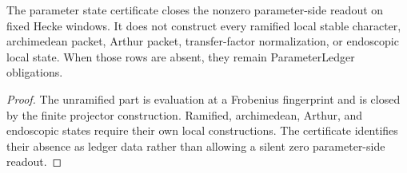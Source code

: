 \begin{theorem}
\label{thm:unified-reality-parameter-state-boundary}
The parameter state certificate closes the nonzero parameter-side
readout on fixed Hecke windows. It does not construct every ramified
local stable character, archimedean packet, Arthur packet,
transfer-factor normalization, or endoscopic local state. When those
rows are absent, they remain ParameterLedger obligations.
\end{theorem}
\begin{proof}
The unramified part is evaluation at a Frobenius fingerprint and is
closed by the finite projector construction. Ramified, archimedean,
Arthur, and endoscopic states require their own local constructions.
The certificate identifies their absence as ledger data rather than
allowing a silent zero parameter-side readout.
\end{proof}
